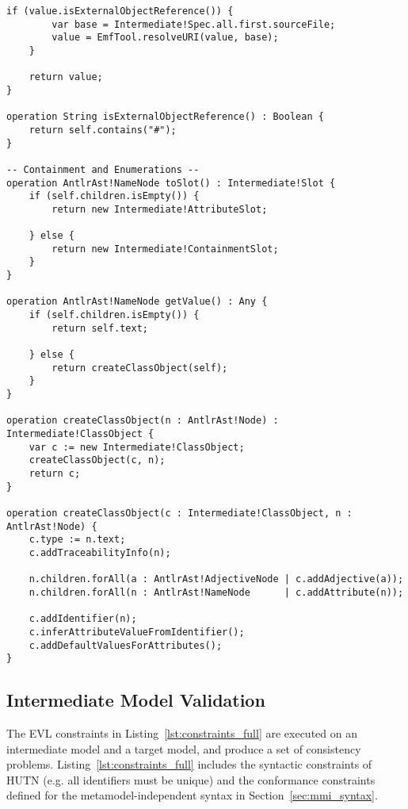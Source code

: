 \begin{lstlisting}[caption=Transforming AST models to intermediate models with ETL., label=lst:m2m_full, language=ETL]
	if (value.isExternalObjectReference()) {
	    var base = Intermediate!Spec.all.first.sourceFile;
		value = EmfTool.resolveURI(value, base);
	}
	
	return value;
}

operation String isExternalObjectReference() : Boolean {
	return self.contains("#");
}

-- Containment and Enumerations --
operation AntlrAst!NameNode toSlot() : Intermediate!Slot {
	if (self.children.isEmpty()) {
		return new Intermediate!AttributeSlot;
		
	} else {
		return new Intermediate!ContainmentSlot;
	}	
}

operation AntlrAst!NameNode getValue() : Any {
	if (self.children.isEmpty()) {
		return self.text;
		
	} else {
		return createClassObject(self);
	}
}

operation createClassObject(n : AntlrAst!Node) : Intermediate!ClassObject {
	var c := new Intermediate!ClassObject;
	createClassObject(c, n);
	return c;
}

operation createClassObject(c : Intermediate!ClassObject, n : AntlrAst!Node) {
	c.type := n.text;
	c.addTraceabilityInfo(n);
	
	n.children.forAll(a : AntlrAst!AdjectiveNode | c.addAdjective(a));
	n.children.forAll(n : AntlrAst!NameNode      | c.addAttribute(n));
	
	c.addIdentifier(n);
	c.inferAttributeValueFromIdentifier();
	c.addDefaultValuesForAttributes();
}
\end{lstlisting}

\subsection{Intermediate Model Validation}
The EVL constraints in Listing~\ref{lst:constraints_full} are executed on an intermediate model and a target model, and produce a set of consistency problems. Listing~\ref{lst:constraints_full} includes the syntactic constraints of HUTN (e.g. all identifiers must be unique) and the conformance constraints defined for the metamodel-independent syntax in Section~\ref{sec:mmi_syntax}.

